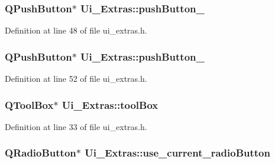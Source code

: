 \hypertarget{classUi__Extras_aa1564e61ad2e27f314d022fed8d86383}{
\subsubsection[{pushButton\_\-11}]{\setlength{\rightskip}{0pt plus 5cm}QPushButton$\ast$ {\bf Ui\_\-Extras::pushButton\_}}}
\label{classUi__Extras_aa1564e61ad2e27f314d022fed8d86383}


Definition at line 48 of file ui\_\-extras.h.

\hypertarget{classUi__Extras_aa0bad61fb43a9419d5e023e3abfd5def}{
\subsubsection[{pushButton\_\-12}]{\setlength{\rightskip}{0pt plus 5cm}QPushButton$\ast$ {\bf Ui\_\-Extras::pushButton\_}}}
\label{classUi__Extras_aa0bad61fb43a9419d5e023e3abfd5def}


Definition at line 52 of file ui\_\-extras.h.

\hypertarget{classUi__Extras_ab6d937b70fceb48a3e7eaa028b5af17a}{
\subsubsection[{toolBox}]{\setlength{\rightskip}{0pt plus 5cm}QToolBox$\ast$ {\bf Ui\_\-Extras::toolBox}}}
\label{classUi__Extras_ab6d937b70fceb48a3e7eaa028b5af17a}


Definition at line 33 of file ui\_\-extras.h.

\hypertarget{classUi__Extras_ad156478b17efed331b8d0663c871816a}{
\subsubsection[{use\_\-current\_\-radioButton}]{\setlength{\rightskip}{0pt plus 5cm}QRadioButton$\ast$ {\bf Ui\_\-Extras::use\_\-current\_\-radioButton}}}
\label{classUi__Extras_ad156478b17efed331b8d0663c871816a}


